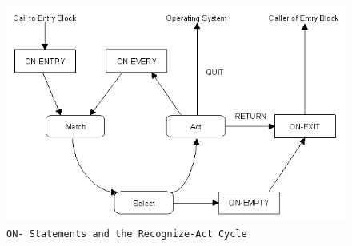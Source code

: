 \begin{figure}
  \centering
  \includegraphics[scale=0.7]{f5-2}
  \caption{\tt{ON-} Statements and the Recognize-Act Cycle}
  \label{f:5-2}
\end{figure}

